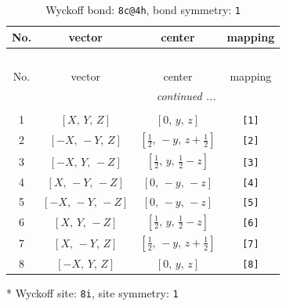 \documentclass[fleqn,8pt]{jsarticle}
\begin{document}
\renewcommand{\arraystretch}{1.2}
\begin{longtable}{cccc}
\caption{Wyckoff bond: {\tt 8c@4h}, bond symmetry: {\tt 1}}
 \\
 \hline \hline
No. & vector & center & mapping \\ \hline \endfirsthead

\multicolumn{3}{l}{\tablename\ \thetable{}} \\
 \hline \hline
No. & vector & center & mapping \\ \hline \endhead

 \hline \hline
\multicolumn{3}{r}{\footnotesize\it continued ...} \\ \endfoot

 \hline \hline
\multicolumn{3}{r}{} \\ \endlastfoot

1 & $\left[ X,\, Y,\, Z \right]$ & $\left[ 0,\, y,\, z \right]$ & {\tt [1]} \\ \hline
2 & $\left[ - X,\, - Y,\, Z \right]$ & $\left[ \frac{1}{2},\, - y,\, z + \frac{1}{2} \right]$ & {\tt [2]} \\ \hline
3 & $\left[ - X,\, Y,\, - Z \right]$ & $\left[ \frac{1}{2},\, y,\, \frac{1}{2} - z \right]$ & {\tt [3]} \\ \hline
4 & $\left[ X,\, - Y,\, - Z \right]$ & $\left[ 0,\, - y,\, - z \right]$ & {\tt [4]} \\ \hline
5 & $\left[ - X,\, - Y,\, - Z \right]$ & $\left[ 0,\, - y,\, - z \right]$ & {\tt [5]} \\ \hline
6 & $\left[ X,\, Y,\, - Z \right]$ & $\left[ \frac{1}{2},\, y,\, \frac{1}{2} - z \right]$ & {\tt [6]} \\ \hline
7 & $\left[ X,\, - Y,\, Z \right]$ & $\left[ \frac{1}{2},\, - y,\, z + \frac{1}{2} \right]$ & {\tt [7]} \\ \hline
8 & $\left[ - X,\, Y,\, Z \right]$ & $\left[ 0,\, y,\, z \right]$ & {\tt [8]} \\
\end{longtable}
* Wyckoff site: {\tt 8i}, site symmetry: {\tt 1}
\renewcommand{\arraystretch}{1.2}
\end{document}
